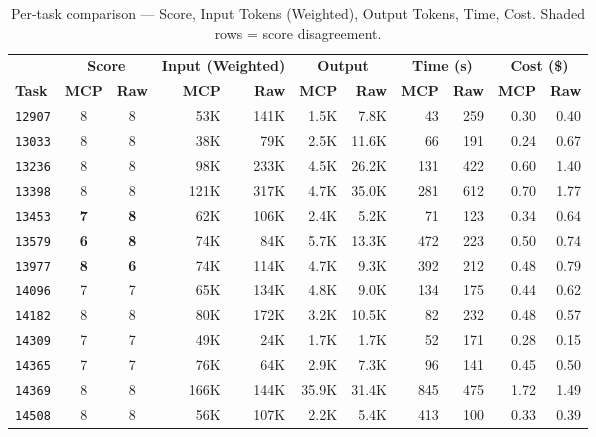 \begin{table}[!htbp]
\centering
\small
\caption{Per-task comparison --- Score, Input Tokens (Weighted), Output Tokens, Time, Cost.
         Shaded rows = score disagreement.}\label{tab:sbs-main}
\setlength{\tabcolsep}{3.5pt}
\begin{tabular}{l cc rr rr rr rr}
\toprule
& \multicolumn{2}{c}{\textbf{Score}}
& \multicolumn{2}{c}{\textbf{Input (Weighted)}}
& \multicolumn{2}{c}{\textbf{Output}}
& \multicolumn{2}{c}{\textbf{Time (s)}}
& \multicolumn{2}{c}{\textbf{Cost (\$)}} \\
\cmidrule(lr){2-3}\cmidrule(lr){4-5}\cmidrule(lr){6-7}\cmidrule(lr){8-9}\cmidrule(lr){10-11}
\textbf{Task}
& \textbf{MCP} & \textbf{Raw}
& \textbf{MCP} & \textbf{Raw}
& \textbf{MCP} & \textbf{Raw}
& \textbf{MCP} & \textbf{Raw}
& \textbf{MCP} & \textbf{Raw} \\
\midrule
\texttt{12907}  & 8 & 8 & 53K & 141K & 1.5K & 7.8K & 43 & 259 & 0.30 & 0.40 \\
\texttt{13033}  & 8 & 8 & 38K & 79K & 2.5K & 11.6K & 66 & 191 & 0.24 & 0.67 \\
\texttt{13236}  & 8 & 8 & 98K & 233K & 4.5K & 26.2K & 131 & 422 & 0.60 & 1.40 \\
\texttt{13398}  & 8 & 8 & 121K & 317K & 4.7K & 35.0K & 281 & 612 & 0.70 & 1.77 \\
\rowcolor{gray!15}
\texttt{13453}  & \textbf{7} & \textbf{8} & 62K & 106K & 2.4K & 5.2K & 71 & 123 & 0.34 & 0.64 \\
\rowcolor{gray!15}
\texttt{13579}  & \textbf{6} & \textbf{8} & 74K & 84K & 5.7K & 13.3K & 472 & 223 & 0.50 & 0.74 \\
\rowcolor{gray!15}
\texttt{13977}  & \textbf{8} & \textbf{6} & 74K & 114K & 4.7K & 9.3K & 392 & 212 & 0.48 & 0.79 \\
\texttt{14096}  & 7 & 7 & 65K & 134K & 4.8K & 9.0K & 134 & 175 & 0.44 & 0.62 \\
\texttt{14182}  & 8 & 8 & 80K & 172K & 3.2K & 10.5K & 82 & 232 & 0.48 & 0.57 \\
\texttt{14309}  & 7 & 7 & 49K & 24K & 1.7K & 1.7K & 52 & 171 & 0.28 & 0.15 \\
\texttt{14365}  & 7 & 7 & 76K & 64K & 2.9K & 7.3K & 96 & 141 & 0.45 & 0.50 \\
\texttt{14369}  & 8 & 8 & 166K & 144K & 35.9K & 31.4K & 845 & 475 & 1.72 & 1.49 \\
\texttt{14508}  & 8 & 8 & 56K & 107K & 2.2K & 5.4K & 413 & 100 & 0.33 & 0.39 \\

\end{tabular}
\end{table}
